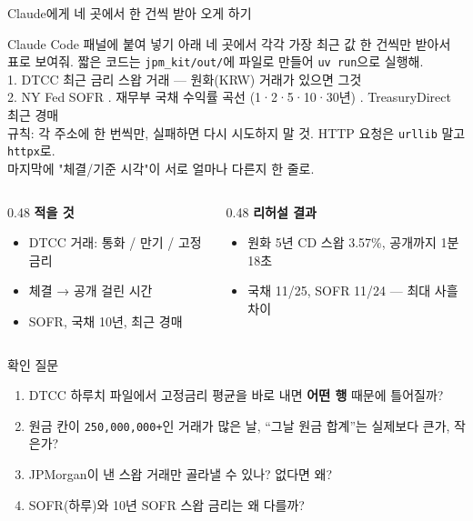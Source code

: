 \documentclass[aspectratio=169,10pt]{beamer}
\begin{document}
\begin{frame}[fragile]{Claude에게 네 곳에서 한 건씩 받아 오게 하기 }
\begin{block}{Claude Code 패널에 붙여 넣기 }
\scriptsize
아래 네 곳에서 각각 가장 최근 값 한 건씩만 받아서 표로 보여줘. 짧은 코드는 \texttt{jpm\_kit/out/}에 파일로 만들어 \texttt{uv run}으로 실행해.\\
1. DTCC 최근 금리 스왑 거래 — 원화(KRW) 거래가 있으면 그것\\
2. NY Fed SOFR . 재무부 국채 수익률 곡선 (1·2·5·10·30년) . TreasuryDirect 최근 경매\\
규칙: 각 주소에 한 번씩만, 실패하면 다시 시도하지 말 것. HTTP 요청은 \texttt{urllib} 말고 \alert{\texttt{httpx}}로.\\
마지막에 "체결/기준 시각"이 서로 얼마나 다른지 한 줄로.
\end{block}
\small
\begin{columns}[T]
\begin{column}{0.48\textwidth}
\textbf{적을 것}
\begin{itemize}\setlength\itemsep{1pt}
\item DTCC 거래: 통화 / 만기 / 고정금리
\item 체결 → 공개 걸린 시간
\item SOFR, 국채 10년, 최근 경매
\end{itemize}
\end{column}
\begin{column}{0.48\textwidth}
\textbf{리허설 결과} 
\begin{itemize}\setlength\itemsep{1pt}
\item 원화 5년 CD 스왑 3.57\%, 공개까지 1분 18초
\item 국채 11/25, SOFR 11/24 — \alert{최대 사흘 차이}
\end{itemize}
\end{column}
\end{columns}
\end{frame}

\begin{frame}{확인 질문}
\begin{enumerate}\setlength\itemsep{10pt}
\item DTCC 하루치 파일에서 고정금리 평균을 바로 내면 \textbf{어떤 행} 때문에 틀어질까?
\item 원금 칸이 \texttt{250,000,000+}인 거래가 많은 날, ``그날 원금 합계''는 실제보다 큰가, 작은가?
\item JPMorgan이 낸 스왑 거래만 골라낼 수 있나? 없다면 왜?
\item SOFR(하루)와 10년 SOFR 스왑 금리는 왜 다를까?
\end{enumerate}
\end{frame}
\end{document}

